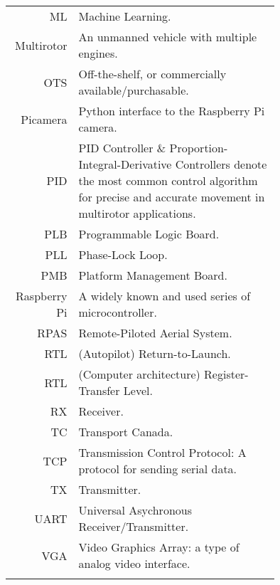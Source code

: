 \begin{tabular}[h]{rp{0.75\linewidth}}
    ML & Machine Learning.\\
    Multirotor & An unmanned vehicle with multiple engines. \\
    OTS & Off-the-shelf, or commercially available/purchasable. \\
    Picamera & Python interface to the Raspberry Pi camera. \\
    PID & PID Controller \& Proportion-Integral-Derivative Controllers denote the most common control algorithm for precise and accurate movement in multirotor applications.\\
    PLB & Programmable Logic Board. \\
    PLL & Phase-Lock Loop. \\
    PMB & Platform Management Board. \\
    Raspberry Pi & A widely known and used series of microcontroller. \\
    RPAS & Remote-Piloted Aerial System.\\
    RTL & (Autopilot) Return-to-Launch.\\
    RTL & (Computer architecture) Register-Transfer Level.\\
    RX & Receiver.\\
    TC & Transport Canada.\\
    TCP & Transmission Control Protocol: A protocol for sending serial data. \\
    TX & Transmitter.\\
    UART & Universal Asychronous Receiver/Transmitter. \\
    VGA & Video Graphics Array: a type of analog video interface. \\
     & \\

    \hline

\end{tabular}
